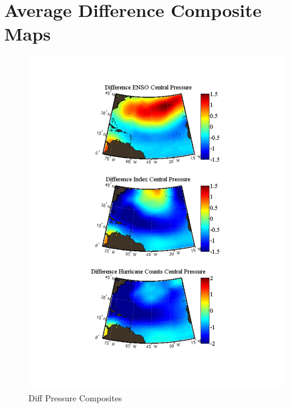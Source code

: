 \documentclass[a4paper,10pt]{article}
\begin{document}
\section{Average Difference Composite Maps}
\begin{figure}[ht]
\begin{minipage}[b]{0.6\linewidth}
\includegraphics[width=\textwidth]{figs/sensitivityResults/compositeMaps/centralPressureAtlanticMap.pdf}
\caption{Diff Pressure Composites}
\label{fig:figure21}
\end{minipage}
\hspace{0cm}
\begin{minipage}[b]{0.6\linewidth}

\end{minipage}
\end{figure}
\end{document}
